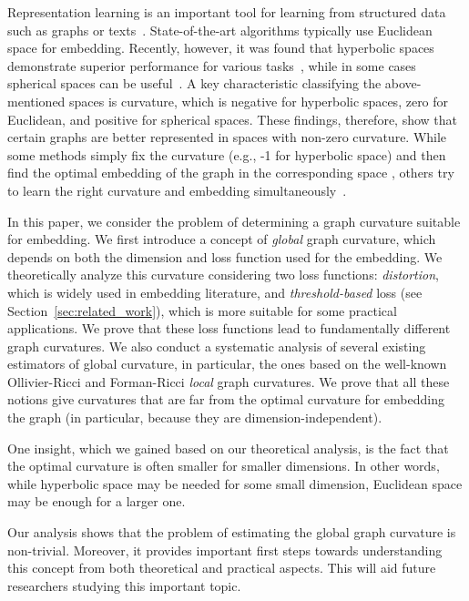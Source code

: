 \documentclass[runningheads]{llncs}
\begin{document}
Representation learning is an important tool for learning from structured data such as graphs or texts~\cite{grover2016node2vec,mikolov2013distributed,perozzi2014deepwalk}.
State-of-the-art algorithms typically use Euclidean space for embedding. 
Recently, however, it was found that hyperbolic spaces demonstrate superior performance for various tasks~\cite{nickel2018learning,sala2018representation}, while in some cases spherical spaces can be useful~\cite{liu2017sphereface}. A key characteristic classifying the above-mentioned spaces is curvature, which is negative for hyperbolic spaces, zero for Euclidean, and positive for spherical spaces. These findings, therefore, show that certain graphs are better represented in spaces with non-zero curvature. While some methods simply fix the curvature (e.g., -1 for hyperbolic space) and then find the optimal embedding of the graph in the corresponding space \cite{nickel2018learning}, others try to learn the right curvature and embedding simultaneously~\cite{gu2019learning}.

In this paper, we consider the problem of determining a graph curvature suitable for embedding. 
We first introduce a concept of \textit{global} graph curvature, which depends on both the dimension and loss function used for the embedding. 
We theoretically analyze this curvature considering two loss functions: \emph{distortion}, which is widely used in embedding literature, and \emph{threshold-based} loss (see Section~\ref{sec:related_work}), which is more suitable for some practical applications. 
We prove that these loss functions lead to fundamentally different graph curvatures. 
We also conduct a systematic analysis of several existing estimators of global curvature, in particular, the ones based on the well-known Ollivier-Ricci and Forman-Ricci \textit{local} graph curvatures. 
We prove that all these notions give curvatures that are far from the optimal curvature for embedding the graph (in particular, because they are dimension-independent). 

One insight, which we gained based on our theoretical analysis, is the fact that the optimal curvature is often smaller for smaller dimensions. In other words, while hyperbolic space may be needed for some small dimension, Euclidean space may be enough for a larger one.

Our analysis shows that the problem of estimating the global graph curvature is non-trivial. Moreover, it provides important first steps towards understanding this concept from both theoretical and practical aspects. This will aid future researchers studying this important topic.
\end{document}
